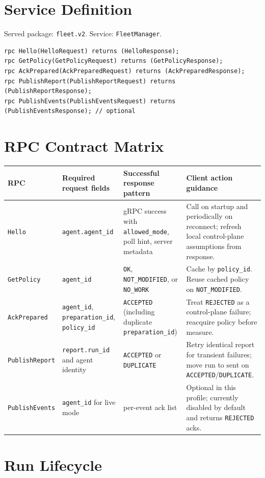 \documentclass[11pt,a4paper]{article}
\begin{document}
\section{Service Definition}
Served package: \texttt{fleet.v2}. Service: \texttt{FleetManager}.

\begin{verbatim}
rpc Hello(HelloRequest) returns (HelloResponse);
rpc GetPolicy(GetPolicyRequest) returns (GetPolicyResponse);
rpc AckPrepared(AckPreparedRequest) returns (AckPreparedResponse);
rpc PublishReport(PublishReportRequest) returns (PublishReportResponse);
rpc PublishEvents(PublishEventsRequest) returns (PublishEventsResponse); // optional
\end{verbatim}

\section{RPC Contract Matrix}
\begin{longtable}{p{2.5cm}p{3.0cm}p{4.0cm}p{4.3cm}}
\textbf{RPC} & \textbf{Required request fields} & \textbf{Successful response pattern} & \textbf{Client action guidance} \\
\hline
\endhead
\texttt{Hello} &
\texttt{agent.agent\_id} &
gRPC success with \texttt{allowed\_mode}, poll hint, server metadata &
Call on startup and periodically on reconnect; refresh local control-plane assumptions from response. \\
\texttt{GetPolicy} &
\texttt{agent\_id} &
\texttt{OK}, \texttt{NOT\_MODIFIED}, or \texttt{NO\_WORK} &
Cache by \texttt{policy\_id}. Reuse cached policy on \texttt{NOT\_MODIFIED}. \\
\texttt{AckPrepared} &
\texttt{agent\_id}, \texttt{preparation\_id}, \texttt{policy\_id} &
\texttt{ACCEPTED} (including duplicate \texttt{preparation\_id}) &
Treat \texttt{REJECTED} as a control-plane failure; reacquire policy before measure. \\
\texttt{PublishReport} &
\texttt{report.run\_id} and agent identity &
\texttt{ACCEPTED} or \texttt{DUPLICATE} &
Retry identical report for transient failures; move run to sent on \texttt{ACCEPTED}/\texttt{DUPLICATE}. \\
\texttt{PublishEvents} &
\texttt{agent\_id} for live mode &
per-event ack list &
Optional in this profile; currently disabled by default and returns \texttt{REJECTED} acks. \\
\hline
\end{longtable}

\section{Run Lifecycle}
\end{document}
